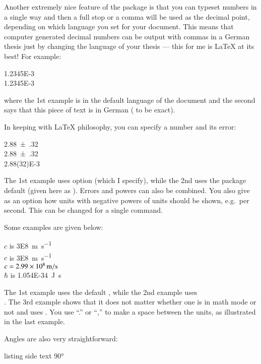 Another extremely nice feature of the package is that you can typeset
numbers in a single way and then a full stop or a comma will be used
as the decimal point, depending on which language you set for your
document. This means that computer generated decimal numbers can be
output with commas in a German thesis just by changing the language of
your thesis --- this for me is \LaTeX{} at its best! For example:
\begin{tcblisting}{}
\num{1.2345E-3}\\
\foreignlanguage{ngerman}{\num{1.2345E-3}}
\end{tcblisting}
\noindent
where the 1st example is in the default language of the document and
the second says that this piece of text is in German
( to be exact).

In keeping with \LaTeX{} philosophy, you can specify a number and its
error:
\begin{tcblisting}{}
\num{2.88(32)}\\
\num[separate-uncertainty=false]{2.88(32)}\\
\num{2.88(32)E-3}
\end{tcblisting}
The 1st example uses  option
(which I specify), while the 2nd uses the package default
(given here as ).
Errors and powers can also be combined.
You also give as
an option how units with negative powers of units should be shown,
e.g.\ per second. This can be changed for a single command.

Some examples are given below:
\begin{tcblisting}{}
\(c\) is \SI{3E8}{\metre\per\second}\\
\(c\) is \SI[per-mode=fraction, fraction-function=\sfrac]{3E8}{\metre\per\second}\\
\(c = \SI[per-mode=symbol]{2.99E8}{\metre\per\second}\)\\
\(\hbar\) is \SI{1.054E-34}{\joule.\second}
\end{tcblisting}
\noindent
The 1st example uses the default ,
while the 2nd example uses\\
. %
The 3rd example shows that it does not matter whether one is in math mode or not
and uses .
You use \enquote{.} or \enquote{,} to make a space between the units,
as illustrated in the last example.

Angles are also very straightforward:
\begin{tcblisting}{listing side text}
\ang{90}
\end{tcblisting}

